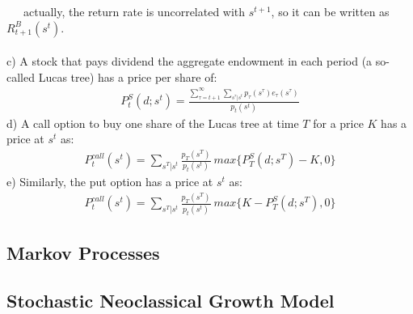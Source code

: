 \documentclass{article}
\begin{document}
\indent\ \ \, actually, the return rate is uncorrelated with $s^{t+1}$, so it can be written as $R^B_{t+1}(s^{t})$.\\\\
\indent c) A stock that pays dividend the aggregate endowment in each period (a so-called Lucas tree) has a price per share of:
\begin{align*}
	P^S_t(d; s^t) = \frac{\sum^\infty_{\tau=t+1} \sum_{s^\tau|s^t} p_{\tau}(s^\tau) e_{\tau}(s^\tau)}{p_t(s^t)}
\end{align*}
\indent d) A call option to buy one share of the Lucas tree at time $T$ for a price $K$ has a price at $s^t$ as:
\begin{align*}
	P^{call}_t(s^t) = \sum\limits_{s^T|s^t} \frac{p_T(s^T)}{p_t(s^t)}\ max\{P^S_T(d; s^T) - K, 0\}
\end{align*}
\indent e) Similarly, the put option has a price at $s^t$ as:
\begin{align*}
	P^{call}_t(s^t) = \sum\limits_{s^T|s^t} \frac{p_T(s^T)}{p_t(s^t)}\ max\{K - P^S_T(d; s^T), 0\}
\end{align*}


\subsection{Markov Processes}


\subsection{Stochastic Neoclassical Growth Model}
\end{document}
